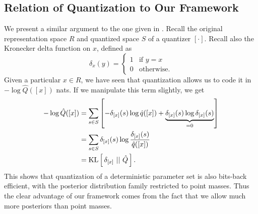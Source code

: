 \subsection{Relation of Quantization to Our Framework}
\par
We present a similar argument to the one given in \cite{havasi2018minimal}.
Recall the original representation space $R$ and quantized space $S$ of a
quantizer $[\cdot]$. Recall also the Kronecker delta function on $x$, defined as 
\[
  \delta_{x}(y) = 
  \begin{cases}
    1 & \text{if } y = x \\
    0 & \text{otherwise}.
  \end{cases}
\]
Given a particular $x \in R$, we have seen that
quantization allows us to code it in $-\log \hat{Q}([x])$ nats. If we manipulate
this term slightly, we get
\begin{align*}
  -\log \hat{Q}([x]) &= \sum_{s \in S} \left[ -\delta_{[x]}(s)\log \hat{q}([x]) + \underbrace{\delta_{[x]}(s) \log \delta_{[x]}(s)}_{= 0} \right] \\
                     &= \sum_{s \in S} \delta_{[x]}(s)\log\frac{\delta_{[x]}(s)}{\hat{q}([x])} \\
                     &= \mathrm{KL}\left[\,\delta_{[x]}\,\,||\,\,\hat{Q}\,\right].
\end{align*}
This shows that quantization of a deterministic parameter set is also
bits-back efficient, with the posterior distribution family restricted to point masses. Thus
the clear advantage of our framework comes from the fact that we allow much more
posteriors than point masses. 

